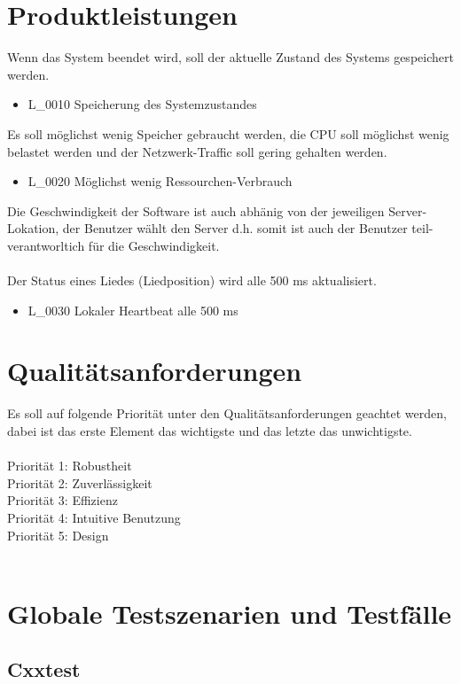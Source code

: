 \section{Produktleistungen}
Wenn das System beendet wird, soll der aktuelle Zustand des Systems gespeichert werden.
\begin{itemize}
        \item L\_0010 Speicherung des Systemzustandes
\end{itemize}
Es soll möglichst wenig Speicher gebraucht werden, die CPU soll möglichst wenig belastet werden und der Netzwerk-Traffic
soll gering gehalten werden.
\begin{itemize}
        \item L\_0020 Möglichst wenig Ressourchen-Verbrauch
\end{itemize}
Die Geschwindigkeit der Software ist auch abhänig von der jeweiligen Server-Lokation, der Benutzer wählt den Server
d.h. somit ist auch der Benutzer teil-verantworltich für die Geschwindigkeit.\ \\ \\
Der Status eines Liedes (Liedposition) wird alle 500 ms aktualisiert.
\begin{itemize}
        \item L\_0030 Lokaler Heartbeat alle 500 ms
\end{itemize}
\section{Qualitätsanforderungen}
Es soll auf folgende Priorität unter den Qualitätsanforderungen geachtet werden,
dabei ist das erste Element das wichtigste und das letzte das unwichtigste.\ \\ \\
Priorität 1: Robustheit\ \\
Priorität 2: Zuverlässigkeit\ \\
Priorität 3: Effizienz\ \\
Priorität 4: Intuitive Benutzung\ \\
Priorität 5: Design\ \\ \\
\section{Globale Testszenarien und Testfälle}
\subsection{Cxxtest}
